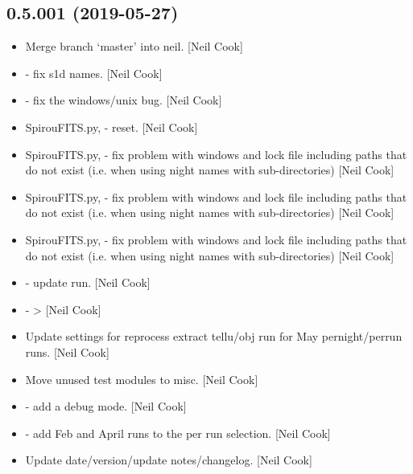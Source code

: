 \documentclass[a4paper,10pt,english]{report}
\begin{document}
\subsection{0.5.001 (2019-05-27)}
\label{\detokenize{misc/changelog:id135}}\begin{itemize}
\item {} 
Merge branch ‘master’ into neil. {[}Neil Cook{]}

\item {} 
 - fix s1d names. {[}Neil Cook{]}

\item {} 
 - fix the windows/unix  bug. {[}Neil Cook{]}

\item {} 
SpirouFITS.py,  - reset. {[}Neil Cook{]}

\item {} 
SpirouFITS.py,  - fix problem with windows and lock file
including paths that do not exist (i.e. when using night names with
sub-directories) {[}Neil Cook{]}

\item {} 
SpirouFITS.py,  - fix problem with windows and lock file
including paths that do not exist (i.e. when using night names with
sub-directories) {[}Neil Cook{]}

\item {} 
SpirouFITS.py,  - fix problem with windows and lock file
including paths that do not exist (i.e. when using night names with
sub-directories) {[}Neil Cook{]}

\item {} 
 - update run. {[}Neil Cook{]}

\item {} 
 -  \textendash{}\textgreater{}  {[}Neil Cook{]}

\item {} 
Update settings for reprocess extract tellu/obj run for May
pernight/perrun runs. {[}Neil Cook{]}

\item {} 
Move unused test modules to misc. {[}Neil Cook{]}

\item {} 
 - add a debug mode. {[}Neil Cook{]}

\item {} 
 - add Feb and April runs to the per
run selection. {[}Neil Cook{]}

\item {} 
Update date/version/update notes/changelog. {[}Neil Cook{]}

\end{itemize}
\end{document}
